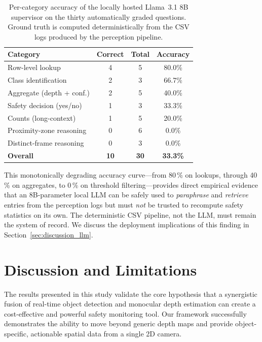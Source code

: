 \documentclass{article}
\begin{document}
\begin{table}[H]
    \centering
    \caption{Per-category accuracy of the locally hosted Llama~3.1 8B supervisor on the thirty automatically graded questions. Ground truth is computed deterministically from the CSV logs produced by the perception pipeline.}
    \label{tab:llm_supervisor}
    \begin{tabular}{lccc}
    \toprule
    \textbf{Category} & \textbf{Correct} & \textbf{Total} & \textbf{Accuracy} \\
    \midrule
    Row-level lookup           & 4 & 5 & 80.0\% \\
    Class identification       & 2 & 3 & 66.7\% \\
    Aggregate (depth + conf.)  & 2 & 5 & 40.0\% \\
    Safety decision (yes/no)   & 1 & 3 & 33.3\% \\
    Counts (long-context)      & 1 & 5 & 20.0\% \\
    Proximity-zone reasoning   & 0 & 6 & 0.0\% \\
    Distinct-frame reasoning   & 0 & 3 & 0.0\% \\
    \midrule
    \textbf{Overall}           & \textbf{10} & \textbf{30} & \textbf{33.3\%} \\
    \bottomrule
    \end{tabular}
\end{table}

This monotonically degrading accuracy curve---from 80\,\% on lookups, through 40\,\% on aggregates, to 0\,\% on threshold filtering---provides direct empirical evidence that an 8B-parameter local LLM can be safely used to \emph{paraphrase} and \emph{retrieve} entries from the perception logs but must \emph{not} be trusted to recompute safety statistics on its own. The deterministic CSV pipeline, not the LLM, must remain the system of record. We discuss the deployment implications of this finding in Section~\ref{sec:discussion_llm}.

\section{Discussion and Limitations}
The results presented in this study validate the core hypothesis that a synergistic fusion of real-time object detection and monocular depth estimation can create a cost-effective and powerful safety monitoring tool. Our framework successfully demonstrates the ability to move beyond generic depth maps and provide object-specific, actionable spatial data from a single 2D camera.
\end{document}
